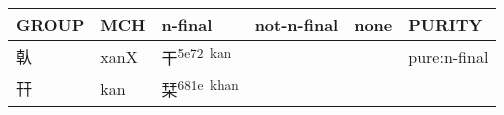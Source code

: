 \documentclass[14pt,a4paper]{scrartcl}
\begin{document}
\begin{longtable}[c]{@{}llllll@{}}
\toprule
\begin{minipage}[b]{0.14\columnwidth}\raggedright\strut
GROUP
\strut\end{minipage} &
\begin{minipage}[b]{0.14\columnwidth}\raggedright\strut
MCH
\strut\end{minipage} &
\begin{minipage}[b]{0.14\columnwidth}\raggedright\strut
n-final
\strut\end{minipage} &
\begin{minipage}[b]{0.14\columnwidth}\raggedright\strut
not-n-final
\strut\end{minipage} &
\begin{minipage}[b]{0.14\columnwidth}\raggedright\strut
none
\strut\end{minipage} &
\begin{minipage}[b]{0.14\columnwidth}\raggedright\strut
PURITY
\strut\end{minipage}\tabularnewline
\midrule
\endhead
\begin{minipage}[t]{0.14\columnwidth}\raggedright\strut
倝
\strut\end{minipage} &
\begin{minipage}[t]{0.14\columnwidth}\raggedright\strut
xanX
\strut\end{minipage} &
\begin{minipage}[t]{0.14\columnwidth}\raggedright\strut
干\textsuperscript{5e72~kan}
\strut\end{minipage} &
\begin{minipage}[t]{0.14\columnwidth}\raggedright\strut
\strut\end{minipage} &
\begin{minipage}[t]{0.14\columnwidth}\raggedright\strut
\strut\end{minipage} &
\begin{minipage}[t]{0.14\columnwidth}\raggedright\strut
pure:n-final
\strut\end{minipage}\tabularnewline
\begin{minipage}[t]{0.14\columnwidth}\raggedright\strut
幵
\strut\end{minipage} &
\begin{minipage}[t]{0.14\columnwidth}\raggedright\strut
kan
\strut\end{minipage} &
\begin{minipage}[t]{0.14\columnwidth}\raggedright\strut
栞\textsuperscript{681e~khan}
\strut\end{minipage} &

\end{longtable}
\end{document}
